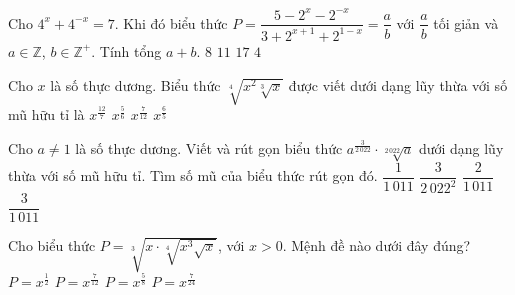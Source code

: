 \begin{ex}%
	Cho $4^x+4^{-x}=7$.  Khi đó biểu thức $P=\dfrac{5-2^x-2^{-x}}{3+2^{x+1}+2^{1-x}}=\dfrac{a}{b}$
	với $\dfrac{a}{b}$ tối giản  và $a\in\mathbb{Z}$, $b\in\mathbb{Z}^+$. Tính tổng $a+b$.
	\choice 
		 {$8$}
		 {\True $11$}
		{$17$} 
		{$4$} 
\end{ex}

\begin{ex}%
	Cho $x$ là  số thực dương. Biểu thức $\sqrt[4]{x^2\sqrt[3]{x}}$ được viết dưới dạng lũy thừa với số mũ hữu tỉ là
	\choice 
		 {$x^{\tfrac{12}{7}}$}
		 {$x^{\tfrac{5}{6}}$}
		{\True $x^{\tfrac{7}{12}}$} 
		{$x^{\tfrac{6}{5}}$} 
\end{ex}

\begin{ex}%
	Cho $a \neq 1$ là số thực dương. Viết và rút gọn biểu thức $a^{\tfrac{3}{2\,022}} \cdot \sqrt[2\,022]{a}$ dưới dạng lũy thừa với số mũ hữu tỉ. Tìm số mũ của biểu thức rút  gọn đó.
	\choice 
		{$\dfrac{1}{1\,011}$} 
		 {$\dfrac{3}{2\,022^2}$}
		{\True  $\dfrac{2}{1\,011}$}
		 {$\dfrac{3}{1\,011}$}
\end{ex}

\begin{ex}%
	Cho biểu thức $P=\sqrt[3]{x\cdot \sqrt[4]{x^3\sqrt{x}}}$, với $x>0$.  Mệnh đề nào dưới đây đúng?
	 \choice
		 {$P=x^{\tfrac{1}{2}}$}
		{$P=x^{\tfrac{7}{12}}$} 
		{\True  $P=x^{\tfrac{5}{8}}$}
		 {$P=x^{\tfrac{7}{24}}$}
\end{ex}


